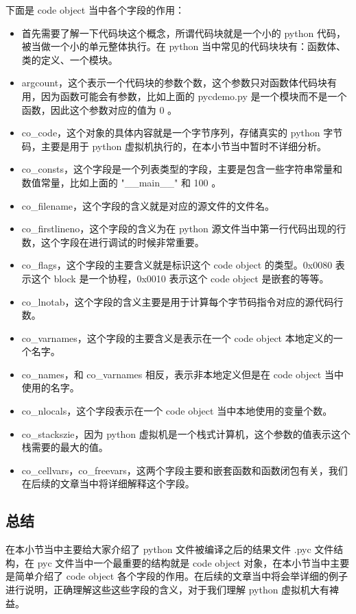 下面是 code object 当中各个字段的作用：
\begin{itemize}
\item 首先需要了解一下代码块这个概念，所谓代码块就是一个小的 python 代码，被当做一个小的单元整体执行。在 python 当中常见的代码块块有：函数体、类的定义、一个模块。 
\item argcount，这个表示一个代码块的参数个数，这个参数只对函数体代码块有用，因为函数可能会有参数，比如上面的 pycdemo.py 是一个模块而不是一个函数，因此这个参数对应的值为 0 。 
\item co\_code，这个对象的具体内容就是一个字节序列，存储真实的 python 字节码，主要是用于 python 虚拟机执行的，在本小节当中暂时不详细分析。 
\item co\_consts，这个字段是一个列表类型的字段，主要是包含一些字符串常量和数值常量，比如上面的 "\_\_main\_\_" 和 100 。 
\item co\_filename，这个字段的含义就是对应的源文件的文件名。 
\item co\_firstlineno，这个字段的含义为在 python 源文件当中第一行代码出现的行数，这个字段在进行调试的时候非常重要。 
\item co\_flags，这个字段的主要含义就是标识这个 code object 的类型。0x0080 表示这个 block 是一个协程，0x0010 表示这个 code object 是嵌套的等等。 
\item co\_lnotab，这个字段的含义主要是用于计算每个字节码指令对应的源代码行数。 
\item co\_varnames，这个字段的主要含义是表示在一个 code object 本地定义的一个名字。 
\item co\_names，和 co\_varnames 相反，表示非本地定义但是在 code object 当中使用的名字。 
\item co\_nlocals，这个字段表示在一个 code object 当中本地使用的变量个数。 
\item co\_stackszie，因为 python 虚拟机是一个栈式计算机，这个参数的值表示这个栈需要的最大的值。 
\item co\_cellvars，co\_freevars，这两个字段主要和嵌套函数和函数闭包有关，我们在后续的文章当中将详细解释这个字段。 
\end{itemize}
\subsection{总结}
在本小节当中主要给大家介绍了 python 文件被编译之后的结果文件 .pyc 文件结构，在 pyc 文件当中一个最重要的结构就是 code object 对象，在本小节当中主要是简单介绍了 code object 各个字段的作用。在后续的文章当中将会举详细的例子进行说明，正确理解这些这些字段的含义，对于我们理解 python 虚拟机大有裨益。

